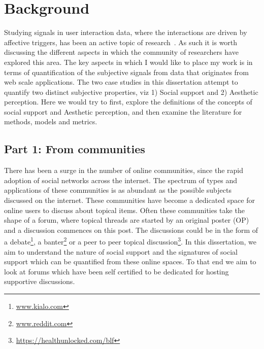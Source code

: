 \chapter{Background}  %
\label{chap:background}
%

Studying signals in user interaction data, where the interactions are  driven by affective triggers, has been an active topic of research~\cite{picard2003affective,pantic2007human,cambria2012sentic,adibuzzaman2013situ}. 
As such it is worth discussing the different aspects in which the community of researchers have explored this area. The key aspects in which I would like to place my work is in terms of quantification of the subjective signals from data that originates from web scale applications. 
The two case studies in this dissertation attempt to quantify two distinct subjective properties, viz 1) Social support and 2) Aesthetic perception.
Here we would try to first, explore the definitions of the concepts of social support and Aesthetic perception, and then examine the literature for methods, models and metrics.

\section{Part 1: From communities}
There has been a surge in the number of online communities, since the rapid adoption of social networks across the internet. The spectrum of types and applications of these communities is as abundant as the possible subjects discussed on the internet. 
These communities have become a dedicated space for online users to discuss about topical items. Often these communities take the shape of a forum, where topical threads are started by an original poster (OP) and a discussion commences on this post. The discussions could be in the form of a debate\footnote{\url{www.kialo.com}}, a banter\footnote{\url{www.reddit.com}} or a peer to peer topical discussion\footnote{\url{https://healthunlocked.com/blf}}. In this dissertation, we aim to understand the nature of social support and the signatures of social support which can be quantified from these online spaces. To that end we aim to look at forums which have been self certified to be dedicated for hosting supportive discussions.

